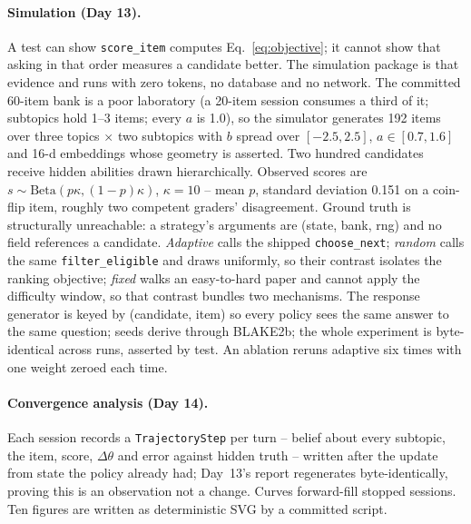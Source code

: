 \documentclass{tietreport}
\begin{document}
\paragraph{Simulation (Day 13).} A test can show \texttt{score\_item} computes
Eq.~\eqref{eq:objective}; it cannot show that asking in that order measures a candidate better.
The simulation package is that evidence and runs with zero tokens, no database and no network.
The committed 60-item bank is a poor laboratory (a 20-item session consumes a third of it;
subtopics hold 1--3 items; every $a$ is 1.0), so the simulator generates 192 items over three
topics $\times$ two subtopics with $b$ spread over $[-2.5,2.5]$, $a\in[0.7,1.6]$ and 16-d
embeddings whose geometry is asserted. Two hundred candidates receive hidden abilities drawn
hierarchically. Observed scores are $s\sim\mathrm{Beta}(p\kappa,(1-p)\kappa)$, $\kappa=10$ -- mean
$p$, standard deviation 0.151 on a coin-flip item, roughly two competent graders' disagreement.
Ground truth is structurally unreachable: a strategy's arguments are (state, bank, rng) and no
field references a candidate. \emph{Adaptive} calls the shipped \texttt{choose\_next};
\emph{random} calls the same \texttt{filter\_eligible} and draws uniformly, so their contrast
isolates the ranking objective; \emph{fixed} walks an easy-to-hard paper and cannot apply the
difficulty window, so that contrast bundles two mechanisms. The response generator is keyed by
(candidate, item) so every policy sees the same answer to the same question; seeds derive
through BLAKE2b; the whole experiment is byte-identical across runs, asserted by test. An
ablation reruns adaptive six times with one weight zeroed each time.

\paragraph{Convergence analysis (Day 14).} Each session records a \texttt{TrajectoryStep} per
turn -- belief about every subtopic, the item, score, $\Delta\theta$ and error against hidden
truth -- written after the update from state the policy already had; Day~13's report
regenerates byte-identically, proving this is an observation not a change. Curves forward-fill
stopped sessions. Ten figures are written as deterministic SVG by a committed script.
\end{document}
